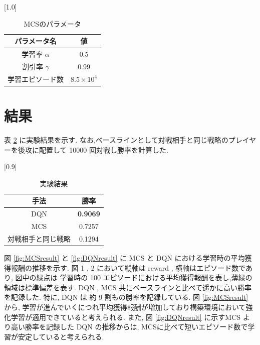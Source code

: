 \documentclass[twocolumn]{jarticle}
\begin{document}
    \begin{table}[t]
      \centering
      \caption{MCSのパラメータ}
      \vspace{-0.3cm}
      \label{table:mcsparam}
      \scalebox{1.0}[1.0]{
        \begin{tabular}{|c|c|}
          \hline
          パラメータ名 & 値 \\ \hline \hline
          学習率 $\alpha$ & 0.5 \\ \hline
          割引率 $\gamma$ & 0.99 \\ \hline     
          学習エピソード数 & $8.5 \times 10^4$ \\ \hline
    
          \end{tabular}
      }
      \end{table}


\section{結果}
表 \ref{table:result} に実験結果を示す. なお,ベースラインとして対戦相手と同じ戦略のプレイヤーを後攻に配置して 10000 回対戦し勝率を計算した.
\begin{table}[t]
  \centering
  \caption{実験結果}
  \vspace{-0.3cm}
  \label{table:result}
  \scalebox{0.9}[0.9]{
    \begin{tabular}{|c|c|}
      \hline
      手法 & 勝率 \\ \hline \hline
      DQN & \textbf{0.9069} \\ \hline
      MCS & 0.7257 \\ \hline     
      対戦相手と同じ戦略 & 0.1294 \\ \hline

      \end{tabular}
  }
  \end{table}

  図 \ref{fig:MCSresult} と \ref{fig:DQNresult} に MCS と DQN における学習時の平均獲得報酬の推移を示す. 図 1 , 2 において縦軸は reward , 横軸はエピソード数であり, 図中の緑点は 学習時の 100 エピソードにおける平均獲得報酬を表し,薄緑の領域は標準偏差を表す.
  DQN , MCS 共にベースラインと比べて遥かに高い勝率を記録した. 特に, DQN は 約 9 割もの勝率を記録している.
図 \ref{fig:MCSresult} から, 学習が進んでいくにつれ平均獲得報酬が増加しており構築環境において強化学習が適用できていると考えられる.
また, 図 \ref{fig:DQNresult} に示すMCS より高い勝率を記録した DQN の推移からは, MCSに比べて短いエピソード数で学習が安定していると考えられる.
\end{document}
